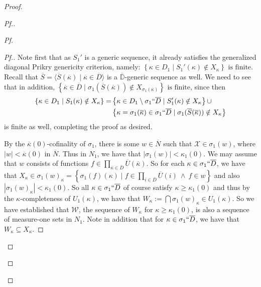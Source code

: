 \documentclass{amsart}
\theoremstyle{definition}
\theoremstyle{remark}
\newcommand{\D}{\mathbb{D}}
\newcommand{\N}{{\overline{N}}}
\renewcommand{\S}{{\overline{S}}}
\newcommand{\U}{\mathcal{U}}
\newcommand{\st}{\; | \;}
\newcommand{\set}[2]{\left\{#1\st #2 \right\}}
\newcommand{\seq}[2]{\langle #1 \st #2 \rangle}
\begin{document}
\begin{proof}
\begin{proof}[Pf.]
\begin{proof}[Pf]
\begin{proof}[Pf.]
Note first that as $S_1'$ is a generic sequence, it already satisfies the generalized diagonal Prikry genericity criterion, namely:
$\set{ \kappa \in D_1}{ S_1'(\kappa) \notin X_\kappa } \text{ is finite.}$
Recall that $\S = \seq{ \S(\overline \kappa) }{ \overline \kappa \in \overline D }$ is a $\overline{\D}$-generic sequence as well.
We need to see that in addition,
$\set{ \overline \kappa \in \overline D}{\sigma_1(\S(\overline \kappa)) \notin X_{\sigma_1(\overline \kappa)} }  \text{ is finite,}$
since then 
\begin{align*}
\set{ \kappa \in D_1}{ S_1(\kappa) \notin X_\kappa } = & \set{ \kappa \in D_1 \setminus \sigma_1``\overline D}{ S_1'(\kappa) \notin X_\kappa } \cup\\
& \set{ \kappa = \sigma_1(\overline \kappa) \in \sigma_1``\overline D}{\sigma_1(\S(\overline \kappa)) \notin X_\kappa }
\end{align*}
is finite as well, completing the proof as desired.

By the $\overline{\kappa}(0)$-cofinality of $\sigma_1$, there is some $w \in \N$ such that $\mathcal X \in \sigma_1(w)$, where $|w| < \overline{\kappa}(0)$ in $\N$. Thus in $N_1$, we have that $|\sigma_1(w)| < \kappa_1(0)$. 
We may assume that $w$ consists of functions $f \in \prod_{\overline \kappa \in \overline D} \overline U(\overline \kappa)$.
So for each $\kappa \in \sigma_1``\overline D$, we have that $X_\kappa \in \sigma_1(w)_\kappa = \set{\sigma_1(f)(\kappa) }{ f \in \prod_{i \in \overline D} \overline U(i) \ \land \ f \in w }$ and also $|\sigma_1(w)_\kappa|<\kappa_1(0).$ So all $\kappa \in \sigma_1``\overline D$ of course satisfy $\kappa \geq \kappa_1(0)$ and thus by the $\kappa$-completeness of $U_1(\kappa)$, we have that $W_\kappa := \bigcap \sigma_1(w)_\kappa \in  U_1(\kappa).$
So we have established that $\mathcal W$, the sequence of $W_\kappa$ for $\kappa \geq \kappa_1(0)$, is also a sequence of measure-one sets in $N_1$. Note in addition that for $\kappa \in \sigma_1``\overline D$, we have that $W_\kappa \subseteq X_\kappa$. 


\end{proof}
\end{proof}
\end{proof}
\end{proof}
\end{document}
